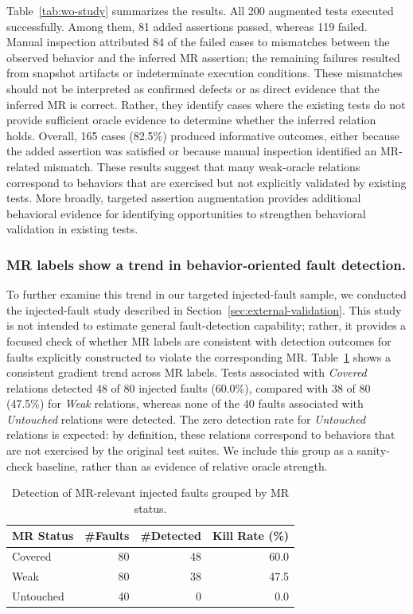 Table~\ref{tab:wo-study} summarizes the results. All 200 augmented tests executed successfully. Among them, 81 added assertions passed, whereas 119 failed. Manual inspection attributed 84 of the failed cases to mismatches between the observed behavior and the inferred MR assertion; the remaining failures resulted from snapshot artifacts or indeterminate execution conditions. These mismatches should not be interpreted as confirmed defects or as direct evidence that the inferred MR is correct. Rather, they identify cases where the existing tests do not provide sufficient oracle evidence to determine whether the inferred relation holds.
Overall, 165 cases (82.5\%) produced informative outcomes, either because the added assertion was satisfied or because manual inspection identified an MR-related mismatch. These results suggest that many weak-oracle relations correspond to behaviors that are exercised but not explicitly validated by existing tests. More broadly, targeted assertion augmentation provides additional behavioral evidence for identifying opportunities to strengthen behavioral validation in existing tests.


\subsubsection{MR labels show a trend in behavior-oriented fault detection.}
To further examine this trend in our targeted injected-fault sample, we conducted the injected-fault study described in Section~\ref{sec:external-validation}. This study is not intended to estimate general fault-detection capability; rather, it provides a focused check of whether MR labels are consistent with detection outcomes for faults explicitly constructed to violate the corresponding MR.
Table~\ref{tab:mr_fault_detection} shows a consistent gradient trend across MR labels. Tests associated with \textit{Covered} relations detected 48 of 80 injected faults (60.0\%), compared with 38 of 80 (47.5\%) for \textit{Weak} relations, whereas none of the 40 faults associated with \textit{Untouched} relations were detected. The zero detection rate for \textit{Untouched} relations is expected: by definition, these relations correspond to behaviors that are not exercised by the original test suites. We include this group as a sanity-check baseline, rather than as evidence of relative oracle strength.

\begin{table}[h]
\centering
\caption{Detection of MR-relevant injected faults grouped by MR status.}
\label{tab:mr_fault_detection}
\small
\setlength{\tabcolsep}{4pt}
\begin{tabular}{lrrr}
\toprule
\textbf{MR Status} & \textbf{\#Faults} & \textbf{\#Detected} & \textbf{Kill Rate} (\%) \\
\midrule
Covered   & 80 & 48 & 60.0 \\
Weak      & 80 & 38 & 47.5 \\
Untouched & 40 &  0 & 0.0 \\
\bottomrule
\end{tabular}
\end{table}

